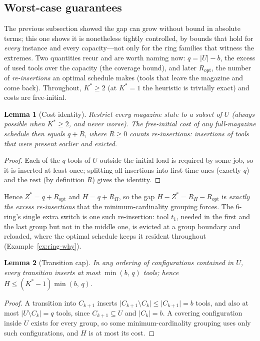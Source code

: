 \documentclass[11pt,a4paper]{article}
\theoremstyle{plain}
\newtheorem{lemma}{Lemma}
\theoremstyle{definition}
\theoremstyle{remark}
\newcommand{\U}{U}
\newcommand{\Kst}{K^{\ast}}
\newcommand{\Zst}{Z^{\ast}}
\begin{document}
\subsection{Worst-case guarantees}\label{ssec:ratio}
The previous subsection showed the gap can grow without bound in absolute terms;
this one shows it is nonetheless tightly controlled, by bounds that hold for
\emph{every} instance and every capacity---not only for the ring families that
witness the extremes. Two quantities recur and are worth naming now: $q=
\lvert\U\rvert-b$, the excess of used tools over the capacity (the coverage
bound), and later $R_{\mathrm{opt}}$, the number of \emph{re-insertions} an
optimal schedule makes (tools that leave the magazine and come back). Throughout,
$\Kst\ge2$ (at $\Kst=1$ the heuristic is trivially exact) and costs are
free-initial.

\begin{lemma}[Cost identity]\label{lem:costid}
Restrict every magazine state to a subset of $\U$ (always possible when $\Kst\ge2$,
and never worse). The free-initial cost of any full-magazine schedule then equals
$q+R$, where $R\ge0$ counts \emph{re-insertions}: insertions of tools that were
present earlier and evicted.
\end{lemma}
\begin{proof}
Each of the $q$ tools of $\U$ outside the initial load is required by some job, so
it is inserted at least once; splitting all insertions into first-time ones (exactly
$q$) and the rest (by definition $R$) gives the identity.
\end{proof}
\noindent Hence $\Zst=q+R_{\mathrm{opt}}$ and $H=q+R_H$, so the gap
$H-\Zst=R_H-R_{\mathrm{opt}}$ is \emph{exactly the excess re-insertions} that the
minimum-cardinality grouping forces. The $6$-ring's single extra switch is one such
re-insertion: tool $t_1$, needed in the first and the last group but not in the
middle one, is evicted at a group boundary and reloaded, where the optimal schedule
keeps it resident throughout (Example~\ref{ex:ring-why}).

\begin{lemma}[Transition cap]\label{lem:transcap}
In any ordering of configurations contained in $\U$, every transition inserts at
most $\min(b,\,q)$ tools; hence $H\le(\Kst-1)\min(b,\,q)$.
\end{lemma}
\begin{proof}
A transition into $C_{k+1}$ inserts $\lvert C_{k+1}\setminus C_k\rvert\le\lvert
C_{k+1}\rvert=b$ tools, and also at most $\lvert\U\setminus C_k\rvert=q$ tools,
since $C_{k+1}\subseteq\U$ and $\lvert C_k\rvert=b$. A covering configuration inside
$\U$ exists for every group, so some minimum-cardinality grouping uses only such
configurations, and $H$ is at most its cost.
\end{proof}
\end{document}
